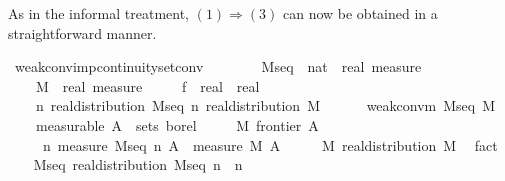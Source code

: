 \documentclass{article}
\theoremstyle{definition}
\begin{document}
\medskip

As in the informal treatment, $(1) \Rightarrow (3)$ can now be obtained in a straightforward manner.

\medskip

\begin{isabellebody}
\isamarkupfalse%
\ weak{\isacharunderscore}conv{\isacharunderscore}imp{\isacharunderscore}continuity{\isacharunderscore}set{\isacharunderscore}conv{\isacharcolon}\isanewline
\ \ \ \isanewline
\ \ \ \ M{\isacharunderscore}seq\ {\isacharcolon}{\isacharcolon}\ {\isachardoublequoteopen}nat\ {\isasymRightarrow}\ real\ measure{\isachardoublequoteclose}\ \isanewline
\ \ \ \ M\ {\isacharcolon}{\isacharcolon}\ {\isachardoublequoteopen}real\ measure{\isachardoublequoteclose}\ \isanewline
\ \ \ \ f\ {\isacharcolon}{\isacharcolon}\ {\isachardoublequoteopen}real\ {\isasymRightarrow}\ real{\isachardoublequoteclose}\isanewline
\ \ \ \isanewline
\ \ \ \ {\isachardoublequoteopen}{\isasymAnd}n{\isachardot}\ real{\isacharunderscore}distribution\ {\isacharparenleft}M{\isacharunderscore}seq\ n{\isacharparenright}{\isachardoublequoteclose}\ {\isachardoublequoteopen}real{\isacharunderscore}distribution\ M{\isachardoublequoteclose}\ \ \isanewline
\ \ \ \ {\isachardoublequoteopen}weak{\isacharunderscore}conv{\isacharunderscore}m\ M{\isacharunderscore}seq\ M{\isachardoublequoteclose}\ \isanewline
\ \ \ \ {\isacharbrackleft}measurable{\isacharbrackright}{\isacharcolon}\ {\isachardoublequoteopen}A\ {\isasymin}\ sets\ borel{\isachardoublequoteclose}\ \isanewline
\ \ \ \ {\isachardoublequoteopen}M\ {\isacharparenleft}frontier\ A{\isacharparenright}\ {\isacharequal}\ {}{\isachardoublequoteclose}\isanewline
\ \ \ \isanewline
\ \ \ \ {\isachardoublequoteopen}{\isacharparenleft}{\isasymlambda}\ n{\isachardot}\ {\isacharparenleft}measure\ {\isacharparenleft}M{\isacharunderscore}seq\ n{\isacharparenright}\ A{\isacharparenright}{\isacharparenright}\ {\isacharminus}{\isacharminus}{\isacharminus}{\isacharminus}{\isachargreater}\ measure\ M\ A{\isachardoublequoteclose}\isanewline
{}\isamarkupfalse%
\ {\isacharminus}\isanewline
\ \ \isamarkupfalse%
\ M{\isacharcolon}\ real{\isacharunderscore}distribution\ M\ \isamarkupfalse%
\ fact\isanewline
\ \ \isamarkupfalse%
\ M{\isacharunderscore}seq{\isacharcolon}\ real{\isacharunderscore}distribution\ {\isachardoublequoteopen}M{\isacharunderscore}seq\ n{\isachardoublequoteclose}\ \ n\ \isamarkupfalse%

\end{isabellebody}
\end{document}
